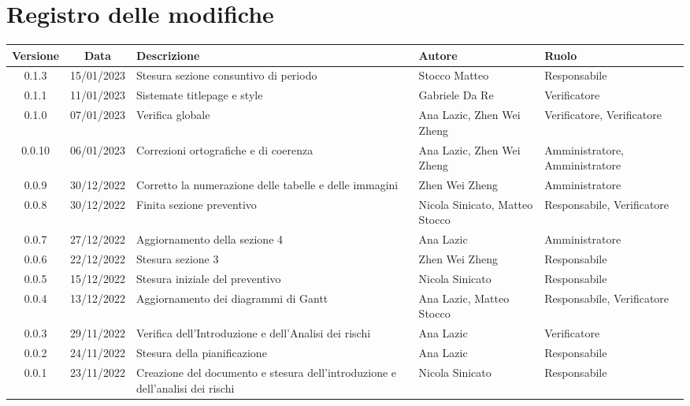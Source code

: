 \section*{Registro delle modifiche}
\begin{center}
	\renewcommand\tabularxcolumn[1]{>{\Centering}m{#1}}
	\begin{tabularx}{\textwidth}{| c | c | X | X | X |} 
		\hline
		\textbf{Versione} & \textbf{Data} & \textbf{Descrizione} & 	\textbf{Autore} & \textbf{Ruolo}\\
		\hline
		0.1.3 & 15/01/2023 & Stesura sezione consuntivo di periodo & Stocco Matteo & Responsabile \\
	    \hline
		0.1.1 & 11/01/2023 & Sistemate titlepage e style & Gabriele Da Re & Verificatore \\
	    \hline
		0.1.0 & 07/01/2023 & Verifica globale & Ana Lazic, Zhen Wei Zheng & Verificatore, Verificatore \\
	    \hline
		0.0.10 & 06/01/2023 & Correzioni ortografiche e di coerenza & Ana Lazic, Zhen Wei Zheng & Amministratore, Amministratore \\
		\hline
		0.0.9 & 30/12/2022 & Corretto la numerazione delle tabelle e delle immagini & Zhen Wei Zheng & Amministratore\\
		\hline
		0.0.8 & 30/12/2022 & Finita sezione preventivo & Nicola Sinicato, Matteo Stocco & Responsabile, Verificatore\\
		\hline
		0.0.7 & 27/12/2022 & Aggiornamento della sezione 4 & Ana Lazic & 	Amministratore\\
		\hline
		0.0.6 & 22/12/2022 & Stesura sezione 3 & Zhen Wei Zheng & Responsabile\\
		\hline
		0.0.5 & 15/12/2022 & Stesura iniziale del preventivo & Nicola Sinicato & Responsabile\\
		\hline
		0.0.4 & 13/12/2022 & Aggiornamento dei diagrammi di Gantt & Ana Lazic, Matteo Stocco & Responsabile, Verificatore\\
		\hline
		0.0.3 & 29/11/2022 & Verifica dell'Introduzione e dell'Analisi dei rischi & Ana Lazic & Verificatore\\
		\hline
		0.0.2 & 24/11/2022 & Stesura della pianificazione & Ana Lazic & Responsabile\\
		\hline
		0.0.1 & 23/11/2022 & Creazione del documento e stesura dell'introduzione e dell'analisi dei rischi & Nicola Sinicato & Responsabile\\
		\hline
	\end{tabularx}
\end{center}
	
	

